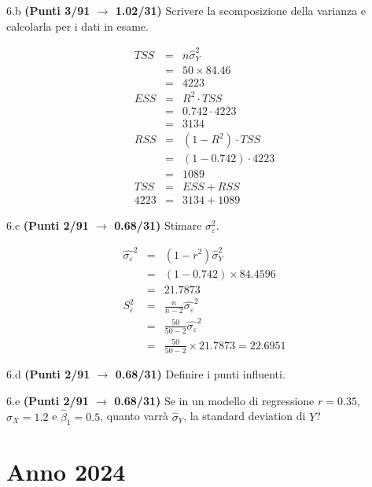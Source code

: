 \documentclass[
  11pt,
]{book}
\theoremstyle{mytheoremstyle}
\theoremstyle{mydefstyle}
\newenvironment{sol}
  {
  \begin{tcolorbox}[enhanced,breakable,arc=0.1mm,boxrule=1pt,colback=white,colframe=iblue,
  title=\bf \fontfamily{lmss}\selectfont \hspace{.5 cm} Soluzione,drop fuzzy shadow]

}{
\end{tcolorbox}
  }
\begin{document}
6.b \textbf{(Punti 3/91 \(\rightarrow\) 1.02/31)} Scrivere la scomposizione della varianza e calcolarla per i dati in esame.

\begin{sol}
\begin{eqnarray*}
   TSS &=& n\hat\sigma^2_Y\\
      &=& 50 \times 84.46 \\
      &=&  4223 \\
   ESS &=& R^2\cdot TSS\\
      &=&  0.742 \cdot 4223 \\
      &=& 3134 \\
   RSS &=& (1-R^2)\cdot TSS\\
      &=& (1- 0.742 )\cdot 4223 \\
      &=&  1089 \\
   TSS &=& ESS+RSS \\ 4223  &=&  3134 + 1089 
  \end{eqnarray*}

\end{sol}

6.c \textbf{(Punti 2/91 \(\rightarrow\) 0.68/31)} Stimare \(\sigma^2_\varepsilon\).

\begin{sol}
\begin{eqnarray*}
\hat{\sigma_\varepsilon}^2&=&(1-r^2)\hat\sigma_Y^2\\
&=& (1-0.742)\times84.4596\\
    &=& 21.7873\\
    S_\varepsilon^2 &=& \frac{n} {n-2} \hat{\sigma_\varepsilon}^2\\
    &=&  \frac{50} {50-2} \hat{\sigma_\varepsilon}^2 \\
 &=&  \frac{50} {50-2} \times 21.7873 = 22.6951 
\end{eqnarray*}

\end{sol}

6.d \textbf{(Punti 2/91 \(\rightarrow\) 0.68/31)} Definire i punti influenti.

6.e \textbf{(Punti 2/91 \(\rightarrow\) 0.68/31)} Se in un modello di regressione \(r=0.35\), \(\hat\sigma_X=1.2\) e \(\hat\beta_1=0.5\), quanto varrà
\(\hat\sigma_Y\), la standard deviation di \(Y\)?

\chapter{Anno 2024}\label{anno-2024}
\end{document}
